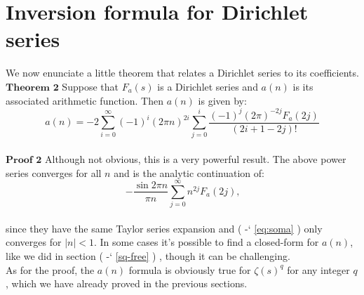 \documentclass[12pt]{article}
\newcommand*{\eqrefe}[1]{%
\begingroup
(\color{BrickRed}
\romannumeral-`\x %
\setcitestyle{numbers}%
\ref{eq:#1}%
\endgroup
)\ignorespacesafterend
}
\newcommand*{\secrefe}[1]{%
\begingroup
(\color{Aquamarine}
\romannumeral-`\x %
\setcitestyle{numbers}%
\ref{#1}%
\endgroup
)\ignorespacesafterend
}
\begin{document}
\section{Inversion formula for Dirichlet series} \label{theo}
We now enunciate a little theorem that relates a Dirichlet series to its coefficients. \\

\indent $\textbf{Theorem 2}$ Suppose that $F_a(s)$ is a Dirichlet series and $a(n)$ is its associated arithmetic function. Then $a(n)$ is given by:
\begin{equation} \label{eq:a(n)} \nonumber
a(n)=-2\sum_{i=0}^{\infty} (-1)^{i}(2\pi n)^{2i}\sum_{j=0}^{i}\frac{(-1)^j (2\pi)^{-2j}F_a(2j)}{(2i+1-2j)!}
\end{equation}\\
\indent $\textbf{Proof 2}$ Although not obvious, this is a very powerful result. The above power series converges for all $n$ and is the analytic continuation of:
\begin{equation} \label{eq:soma}
-\frac{\sin{2\pi n}}{\pi n}\sum_{j=0}^{\infty} n^{2j}F_a(2j) \text{,}
\end{equation}\\
\noindent since they have the same Taylor series expansion and \eqrefe{soma} only converges for $|n|<1$. In some cases it's possible to find a closed-form for $a(n)$, like we did in section \secrefe{sq-free}, though it can be challenging.\\

\indent As for the proof, the $a(n)$ formula is obviously true for $\zeta(s)^q$ for any integer $q$, which we have already proved in the previous sections.\\
\end{document}

